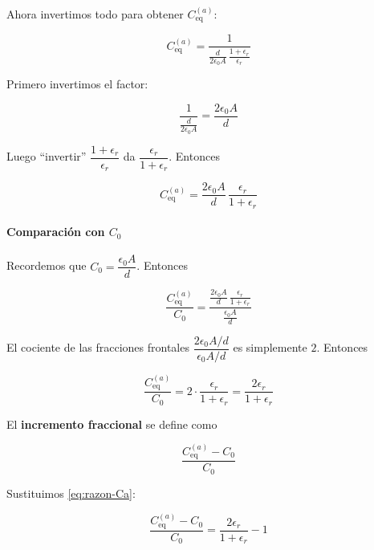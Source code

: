 \documentclass{article}
\begin{document}
Ahora invertimos todo para obtener $C_{\text{eq}}^{(a)}$:

\begin{equation}
C_{\text{eq}}^{(a)} 
= \frac{1}{\displaystyle \frac{d}{2\epsilon_{0}A}\,\frac{1+\epsilon_{r}}{\epsilon_{r}}}
\label{eq:Ceq-a-inv-raw}
\end{equation}

Primero invertimos el factor:

\[
\frac{1}{\frac{d}{2\epsilon_{0}A}} = \frac{2\epsilon_{0}A}{d}
\]

Luego “invertir” $\dfrac{1+\epsilon_{r}}{\epsilon_{r}}$ da $\dfrac{\epsilon_{r}}{1+\epsilon_{r}}$. Entonces

\begin{equation}
C_{\text{eq}}^{(a)} 
= \frac{2\epsilon_{0}A}{d}\,\frac{\epsilon_{r}}{1+\epsilon_{r}}
\label{eq:Ceqa-a}
\end{equation}

\paragraph{Comparación con $C_{0}$}

Recordemos que $C_{0} = \dfrac{\epsilon_{0}A}{d}$. Entonces

\begin{equation}
\frac{C_{\text{eq}}^{(a)}}{C_{0}}
= \frac{\displaystyle \frac{2\epsilon_{0}A}{d}\,\frac{\epsilon_{r}}{1+\epsilon_{r}}}
       {\displaystyle \frac{\epsilon_{0}A}{d}}
\label{eq:razon-Ca-paso1}
\end{equation}

El cociente de las fracciones frontales $\dfrac{2\epsilon_{0}A/d}{\epsilon_{0}A/d}$ es simplemente $2$. Entonces

\begin{equation}
\frac{C_{\text{eq}}^{(a)}}{C_{0}}
= 2\cdot\frac{\epsilon_{r}}{1+\epsilon_{r}}
= \frac{2\epsilon_{r}}{1+\epsilon_{r}}
\label{eq:razon-Ca}
\end{equation}

El \textbf{incremento fraccional} se define como

\[
\frac{C_{\text{eq}}^{(a)} - C_{0}}{C_{0}}
\]

Sustituimos \eqref{eq:razon-Ca}:

\begin{equation}
\frac{C_{\text{eq}}^{(a)} - C_{0}}{C_{0}}
= \frac{2\epsilon_{r}}{1+\epsilon_{r}} - 1
\label{eq:inc-a-paso1}
\end{equation}
\end{document}
